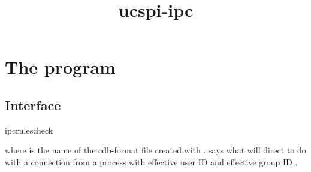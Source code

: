 \documentclass{book}
\title{ucspi-ipc}
\begin{document}
\section{The  program}

\subsection{Interface}
\begin{code}%
  ipcrulescheck 
\end{code}
where  is the name of the cdb-format file created with
.   says what  will direct
 to do with a connection from a process with effective
user ID  and effective group ID
.
\end{document}
